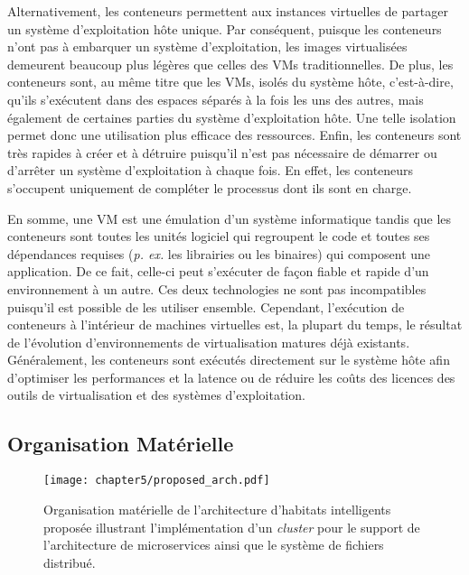 Alternativement, les conteneurs permettent aux instances virtuelles de partager un système d'exploitation hôte unique. Par conséquent, puisque les conteneurs n'ont pas à embarquer un système d'exploitation, les images virtualisées demeurent beaucoup plus légères que celles des \acsp{VM} traditionnelles. De plus, les conteneurs sont, au même titre que les \acsp{VM}, isolés du système hôte, c'est-à-dire, qu'ils s'exécutent dans des espaces séparés à la fois les uns des autres, mais également de certaines parties du système d'exploitation hôte. Une telle isolation permet donc une utilisation plus efficace des ressources. Enfin, les conteneurs sont très rapides à créer et à détruire puisqu'il n'est pas nécessaire de démarrer ou d'arrêter un système d'exploitation à chaque fois. En effet, les conteneurs s'occupent uniquement de compléter le processus dont ils sont en charge.

En somme, une \acs{VM} est une émulation d'un système informatique tandis que les conteneurs sont toutes les unités logiciel qui regroupent le code et toutes ses dépendances requises (\textit{p. ex.} les librairies ou les binaires) qui composent une application. De ce fait, celle-ci peut s'exécuter de façon fiable et rapide d'un environnement à un autre. Ces deux technologies ne sont pas incompatibles puisqu'il est possible de les utiliser ensemble. Cependant, l'exécution de conteneurs à l'intérieur de machines virtuelles est, la plupart du temps, le résultat de l'évolution d'environnements de virtualisation matures déjà existants. Généralement, les conteneurs sont exécutés directement sur le système hôte afin d'optimiser les performances et la latence ou de réduire les coûts des licences des outils de virtualisation et des systèmes d'exploitation.

\subsection{Organisation Matérielle}

\begin{figure}[t]
	\centering
	\texttt{[image: chapter5/proposed\_arch.pdf]}
        \caption{Organisation matérielle de l'architecture d'habitats intelligents proposée illustrant l'implémentation d'un \textit{cluster} pour le support de l'architecture de microservices ainsi que le système de fichiers distribué.}
	\label{fig:proposed_arch}
\end{figure}

